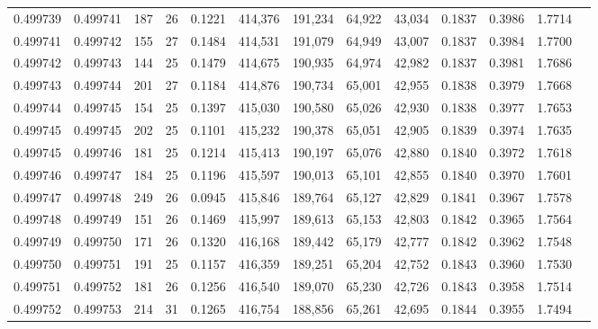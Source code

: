 \begin{tabular}{rrrrrrrrrrrrr}
0.499739 & 0.499741 & 187 &  26 &                                     0.1221 & 414,376 & 191,234 &  64,922 &  43,034 & 0.1837 & 0.3986 & 1.7714 \\
0.499741 & 0.499742 & 155 &  27 &                                     0.1484 & 414,531 & 191,079 &  64,949 &  43,007 & 0.1837 & 0.3984 & 1.7700 \\
0.499742 & 0.499743 & 144 &  25 &                                     0.1479 & 414,675 & 190,935 &  64,974 &  42,982 & 0.1837 & 0.3981 & 1.7686 \\
0.499743 & 0.499744 & 201 &  27 &                                     0.1184 & 414,876 & 190,734 &  65,001 &  42,955 & 0.1838 & 0.3979 & 1.7668 \\
0.499744 & 0.499745 & 154 &  25 &                                     0.1397 & 415,030 & 190,580 &  65,026 &  42,930 & 0.1838 & 0.3977 & 1.7653 \\
0.499745 & 0.499745 & 202 &  25 &                                     0.1101 & 415,232 & 190,378 &  65,051 &  42,905 & 0.1839 & 0.3974 & 1.7635 \\
0.499745 & 0.499746 & 181 &  25 &                                     0.1214 & 415,413 & 190,197 &  65,076 &  42,880 & 0.1840 & 0.3972 & 1.7618 \\
0.499746 & 0.499747 & 184 &  25 &                                     0.1196 & 415,597 & 190,013 &  65,101 &  42,855 & 0.1840 & 0.3970 & 1.7601 \\
0.499747 & 0.499748 & 249 &  26 &                                     0.0945 & 415,846 & 189,764 &  65,127 &  42,829 & 0.1841 & 0.3967 & 1.7578 \\
0.499748 & 0.499749 & 151 &  26 &                                     0.1469 & 415,997 & 189,613 &  65,153 &  42,803 & 0.1842 & 0.3965 & 1.7564 \\
0.499749 & 0.499750 & 171 &  26 &                                     0.1320 & 416,168 & 189,442 &  65,179 &  42,777 & 0.1842 & 0.3962 & 1.7548 \\
0.499750 & 0.499751 & 191 &  25 &                                     0.1157 & 416,359 & 189,251 &  65,204 &  42,752 & 0.1843 & 0.3960 & 1.7530 \\
0.499751 & 0.499752 & 181 &  26 &                                     0.1256 & 416,540 & 189,070 &  65,230 &  42,726 & 0.1843 & 0.3958 & 1.7514 \\
0.499752 & 0.499753 & 214 &  31 &                                     0.1265 & 416,754 & 188,856 &  65,261 &  42,695 & 0.1844 & 0.3955 & 1.7494 \\

\end{tabular}
